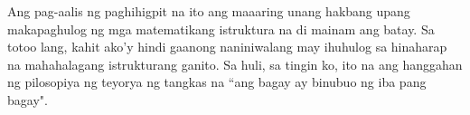 \documentclass{article}
\begin{document}
Ang pag-aalis ng paghihigpit na ito ang maaaring unang hakbang upang makapaghulog ng mga matematikang istruktura na di mainam ang batay. Sa totoo lang, kahit ako'y hindi gaanong naniniwalang may ihuhulog sa hinaharap na mahahalagang istrukturang ganito. Sa huli, sa tingin ko, ito na ang hanggahan ng pilosopiya ng teyorya ng tangkas na ``ang bagay ay binubuo ng iba pang bagay". 



\end{document}
